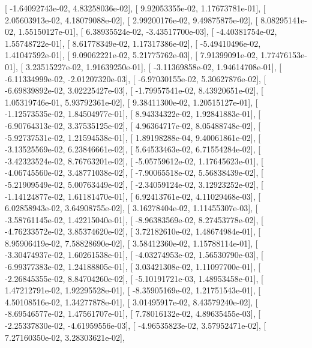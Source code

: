 \documentclass{article}
\begin{document}
       [ -1.64092743e-02,   4.83258036e-02],
       [  9.92053355e-02,   1.17673781e-01],
       [  2.05603913e-02,   4.18079088e-02],
       [  2.99200176e-02,   9.49875875e-02],
       [  8.08295141e-02,   1.55150127e-01],
       [  6.38935524e-02,  -3.43517700e-03],
       [ -4.40381754e-02,   1.55748722e-01],
       [  8.61778349e-02,   1.17317386e-02],
       [ -5.49410496e-02,   1.41047592e-01],
       [  9.09062221e-02,   5.21775762e-03],
       [  7.91399091e-02,   1.77476153e-01],
       [  3.23515227e-02,   1.91639250e-01],
       [ -3.11369858e-02,   1.94614708e-01],
       [ -6.11334999e-02,  -2.01207320e-03],
       [ -6.97030155e-02,   5.30627876e-02],
       [ -6.69839892e-02,   3.02225427e-03],
       [ -1.79957541e-02,   8.43920651e-02],
       [  1.05319746e-01,   5.93792361e-02],
       [  9.38411300e-02,   1.20515127e-01],
       [ -1.12573535e-02,   1.84504977e-01],
       [  8.94334322e-02,   1.92841883e-01],
       [ -6.90764313e-02,   3.37535125e-02],
       [  4.96364717e-02,   8.05488748e-02],
       [ -5.92737531e-02,   1.21594538e-01],
       [  1.89198288e-04,   9.40061861e-02],
       [ -3.13525569e-02,   6.23846661e-02],
       [  5.64533463e-02,   6.71554284e-02],
       [ -3.42323524e-02,   8.76763201e-02],
       [ -5.05759612e-02,   1.17645623e-01],
       [ -4.06745560e-02,   3.48771038e-02],
       [ -7.90065518e-02,   5.56838439e-02],
       [ -5.21909549e-02,   5.00763449e-02],
       [ -2.34059124e-02,   3.12923252e-02],
       [ -1.14124877e-02,   1.61181470e-01],
       [  6.92413761e-02,   4.11029468e-03],
       [  6.02858943e-02,   3.64908755e-02],
       [  3.16278404e-02,   1.11455307e-03],
       [ -3.58761145e-02,   1.42215040e-01],
       [ -8.96383569e-02,   8.27453778e-02],
       [ -4.76233572e-02,   3.85374620e-02],
       [  3.72182610e-02,   1.48674984e-01],
       [  8.95906419e-02,   7.58828690e-02],
       [  3.58412360e-02,   1.15788114e-01],
       [ -3.30474937e-02,   1.60261538e-01],
       [ -4.03274953e-02,   1.56530790e-03],
       [ -6.99377383e-02,   1.24188805e-01],
       [  3.03421308e-02,   1.11097700e-01],
       [ -2.26845355e-02,   8.84704260e-02],
       [ -5.10191721e-03,   1.48953458e-01],
       [  1.47212791e-02,   1.92295528e-01],
       [ -8.35905169e-02,   1.21751543e-01],
       [  4.50108516e-02,   1.34277878e-01],
       [  3.01495917e-02,   8.43579240e-02],
       [ -8.69546577e-02,   1.47561707e-01],
       [  7.78016132e-02,   4.89635455e-03],
       [ -2.25337830e-02,  -4.61959556e-03],
       [ -4.96535823e-02,   3.57952471e-02],
       [  7.27160350e-02,   3.28303621e-02],
\end{document}
